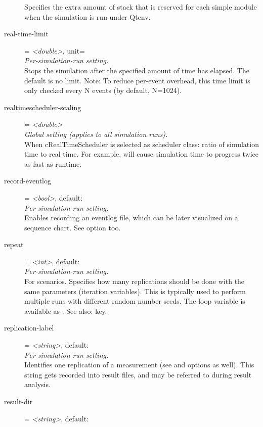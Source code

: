 \begin{description}
    Specifies the extra amount of stack that is reserved for each
     simple module when the simulation is run under Qtenv.
\item[real-time-limit] = \textit{<double>}, unit=\\
    \textit{Per-simulation-run setting.}\\
    Stops the simulation after the specified amount of time has elapsed. The
    default is no limit. Note: To reduce per-event overhead, this time limit is
    only checked every N events (by default, N=1024).
\item[realtimescheduler-scaling] = \textit{<double>}\\
    \textit{Global setting (applies to all simulation runs).}\\
    When cRealTimeScheduler is selected as scheduler class: ratio of simulation
    time to real time. For example,
     will cause
    simulation time to progress twice as fast as runtime.
\item[record-eventlog] = \textit{<bool>}, default: \\
    \textit{Per-simulation-run setting.}\\
    Enables recording an eventlog file, which can be later visualized on a
    sequence chart. See  option too.
\item[repeat] = \textit{<int>}, default: \\
    \textit{Per-simulation-run setting.}\\
    For scenarios. Specifies how many replications should be done with the same
    parameters (iteration variables). This is typically used to perform
    multiple runs with different random number seeds. The loop variable is
    available as . See also:
     key.
\item[replication-label] = \textit{<string>}, default: \\
    \textit{Per-simulation-run setting.}\\
    Identifies one replication of a measurement (see  and
     options as well). This string gets
    recorded into result files, and may be referred to during result analysis.
\item[result-dir] = \textit{<string>}, default: \\

\end{description}
